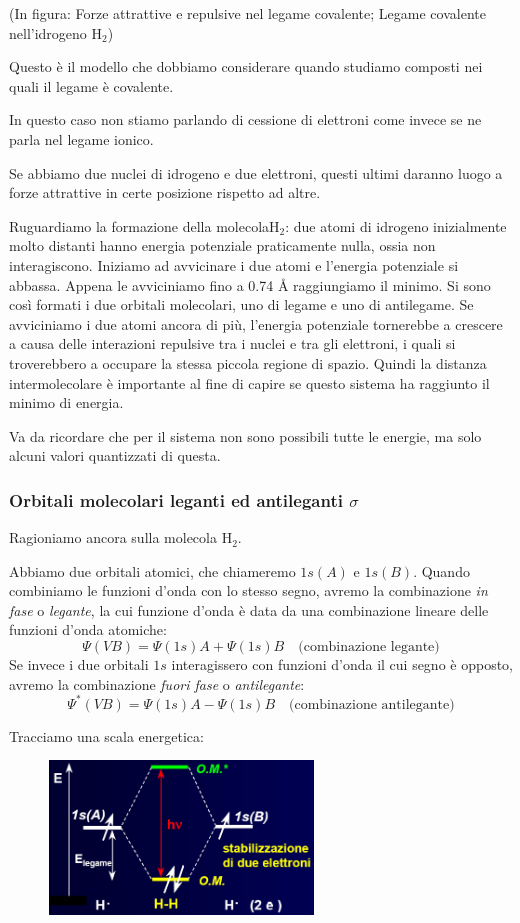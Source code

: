 (In figura: Forze attrattive e repulsive nel legame covalente; Legame covalente nell'idrogeno H$_2$) 

\vspace{0.2cm}Questo è il modello che dobbiamo considerare quando studiamo composti nei quali il legame è covalente.

In questo caso non stiamo parlando di cessione di elettroni come invece se ne parla nel legame ionico.

Se abbiamo due nuclei di idrogeno e due elettroni, questi ultimi daranno luogo a forze attrattive in certe posizione rispetto ad altre.

Ruguardiamo la formazione della molecolaH$_2$: due atomi di idrogeno inizialmente molto distanti hanno energia potenziale praticamente nulla, ossia non interagiscono. Iniziamo ad avvicinare i due atomi e l'energia potenziale si abbassa. Appena le avviciniamo fino a 0.74 Å raggiungiamo il minimo. Si sono così formati i due orbitali molecolari, uno di legame e uno di antilegame. Se avviciniamo i due atomi ancora di più, l'energia potenziale tornerebbe a crescere a causa delle interazioni repulsive tra i nuclei e tra gli elettroni, i quali si troverebbero a occupare la stessa piccola regione di spazio. Quindi la distanza intermolecolare è importante al fine di capire se questo sistema ha raggiunto il minimo di energia.

Va da ricordare che per il sistema non sono possibili tutte le energie, ma solo alcuni valori quantizzati di questa.
\subsubsection{Orbitali molecolari leganti ed antileganti $\sigma$}

Ragioniamo ancora sulla molecola H$_2$.

Abbiamo due orbitali atomici, che chiameremo $1s(A)$ e $1s(B)$. Quando combiniamo le funzioni d'onda con lo stesso segno, avremo la combinazione \textit{in fase} o \textit{legante}, la cui funzione d'onda è data da una combinazione lineare delle funzioni d'onda atomiche:
$$\Psi(VB)=\Psi(1s)A + \Psi(1s)B \quad \text{(combinazione legante)}$$
Se invece i due orbitali $1s$ interagissero con funzioni d'onda il cui segno è opposto, avremo la combinazione \textit{fuori fase} o \textit{antilegante}:
$$\Psi^*(VB)=\Psi(1s)A - \Psi(1s)B \quad \text{(combinazione antilegante)}$$

Tracciamo una scala energetica:

\begin{figure}[htp]
    \centering
    \includegraphics[width=7cm]{immagini/scala_energia_H_2.png}
\end{figure}

